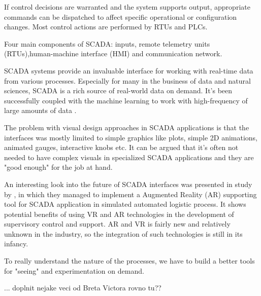 If control decisions are warranted and the system supports output, appropriate commands can be dispatched to affect specific operational or configuration changes. Most control actions are performed by RTUs and PLCs.

Four main components of SCADA: inputs, remote telemetry units (RTUs),human-machine interface (HMI) and communication network.


SCADA systems provide an invaluable interface for working with real-time data from various processes. Especially for many in the business of data and natural sciences, SCADA is a rich source of real-world data on demand. It's been successfully coupled with the machine learning to work with high-frequency of large amounts of data \citep{linWindPowerPrediction2020}. 

The problem with visual design approaches in SCADA applications is that the interfaces was mostly limited to simple graphics like plots, simple 2D animations, animated gauges, interactive knobs etc. It can be argued that it's often not needed to have complex visuals in specialized SCADA applications and they are "good enough" for the job at hand.


An interesting look into the future of SCADA interfaces was presented in study by \cite{soeteMixedRealitySCADA2015}, in which they managed to implement a Augmented Reality (AR) supporting tool for SCADA application in simulated automated logistic process. It shows potential benefits of using VR and AR technologies in the development of supervisory control and support. AR and VR is fairly new and relatively unknown in the industry, so the integration of such technologies is still in its infancy.


To really understand the nature of the processes, we have to build a better tools for "seeing" and experimentation on demand. 

... doplnit nejake veci od Breta Victora rovno tu??

